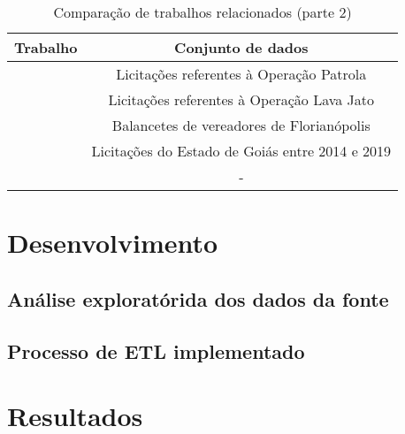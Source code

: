 \begin{table}[h]
\caption{Comparação de trabalhos relacionados (parte 2)}
\label{tab:trabalhos-relacionados-2}
\center
\begin{tabular}{| l | c |}
\hline
\textbf{Trabalho} & \textbf{Conjunto de dados} \\ \hline
\cite{schmitz2024sbbd} & Licitações referentes à Operação Patrola \\ \hline
\cite{schneider2024sbbd} & Licitações referentes à Operação Lava Jato \\ \hline
\cite{santos2021ferramenta} & Balancetes de vereadores de Florianópolis \\ \hline
\cite{jesus2021modelo} & Licitações do Estado de Goiás entre 2014 e 2019 \\ \hline
\cite{mello2024sbbd_estendido} & - \\ \hline
\end{tabular}
\end{table}

\chapter{Desenvolvimento}
\label{cap:Desenvolvimento}

\section{Análise exploratórida dos dados da fonte}

\section{Processo de ETL implementado}

\chapter{Resultados}
\label{cap:Resultados}
